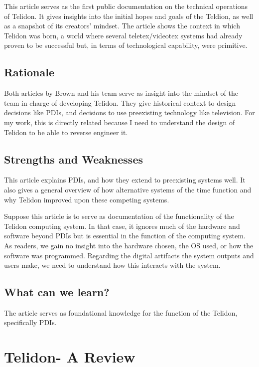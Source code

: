 \documentclass[sigconf]{acmart}
\begin{document}
This article serves as the first public documentation on the technical operations of Telidon. It gives insights into the initial hopes and goals of the Teldion, as well as a snapshot of its creators' mindset. The article shows the context in which Telidon was born, a world where several teletex/videotex systems had already proven to be successful but, in terms of technological capability, were primitive.

\subsection{Rationale}

Both articles by Brown and his team serve as insight into the mindset of the team in charge of developing Telidon. They give historical context to design decisions like PDIs, and decisions to use preexisting technology like television. For my work, this is directly related because I need to understand the design of Telidon to be able to reverse engineer it.

\subsection{Strengths and Weaknesses}

This article explains PDIs, and how they extend to preexisting systems well. It also gives a general overview of how alternative systems of the time function and why Telidon improved upon these competing systems.

Suppose this article is to serve as documentation of the functionality of the Telidon computing system. In that case, it ignores much of the hardware and software beyond PDIs but is essential in the function of the computing system. As readers, we gain no insight into the hardware chosen, the OS used, or how the software was programmed. Regarding the digital artifacts the system outputs and users make, we need to understand how this interacts with the system. 

\subsection{What can we learn?}

The article serves as foundational knowledge for the function of the Telidon, specifically PDIs. 

\section{Telidon- A Review}
\end{document}
